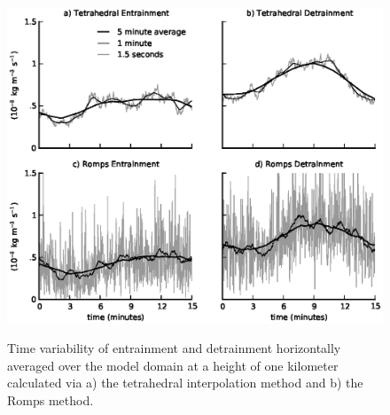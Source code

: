 \documentclass[12pt]{article}
\begin{document}
\begin{figure}[t]
  \noindent
  \includegraphics[width=39pc,angle=0]{./figures/averaging_convergence}\\ 
  \caption{Time variability of entrainment and detrainment horizontally 
  averaged over the model domain at a height of one kilometer calculated via 
  a) the tetrahedral interpolation method and b) the Romps method.
  }
  \label{fig:averaging_convergence}
\end{figure}
\end{document}
